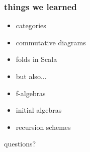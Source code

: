 \documentclass[include/preamble.tex]{subfiles}
\begin{document}
\begin{frame}
  \frametitle{things we learned}
  \begin{itemize}
    \pause
  \item categories
  \item commutative diagrams
  \item folds in Scala
    \newline
    \pause
  \item[] but also...
    \newline
    \pause
  \item f-algebras
    \pause
  \item initial algebras
    \pause
  \item recursion schemes
  \end{itemize}
\end{frame}




{
  \begin{frame}
    \begin{center}
      questions?
    \end{center}
  \end{frame}
}
\end{document}
